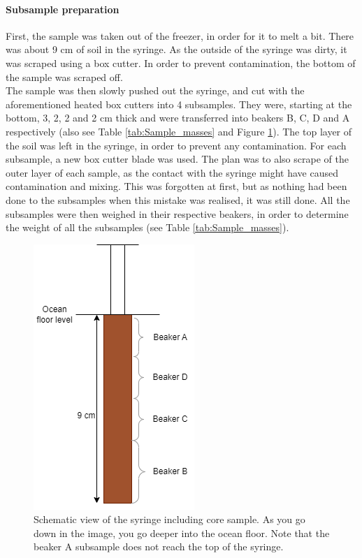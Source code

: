 \documentclass[twocolumn,a4paper,aps,amsmath,amssymb,floatfix,superscriptaddress]{revtex4-2}
\begin{document}
	\paragraph*{Subsample preparation}
	First, the sample was taken out of the freezer, in order for it to melt a bit. There was about 9 cm of soil in the syringe. As the outside of the syringe was dirty, it was scraped using a box cutter. In order to prevent contamination, the bottom of the sample was scraped off. \\
	The sample was then slowly pushed out the syringe, and cut with the aforementioned heated box cutters into 4 subsamples. They were, starting at the bottom, 3, 2, 2 and 2 cm thick and were transferred into beakers B, C, D and A respectively (also see Table \ref{tab:Sample_masses} and Figure \ref{fig:core-schematic}). The top layer of the soil was left in the syringe, in order to prevent any contamination. For each subsample, a new box cutter blade was used. The plan was to also scrape of the outer layer of each sample, as the contact with the syringe might have caused contamination and mixing. This was forgotten at first, but as nothing had been done to the subsamples when this mistake was realised, it was still done. All the subsamples were then weighed in their respective beakers, in order to determine the weight of all the subsamples (see Table \ref{tab:Sample_masses}).\\
	\begin{figure}[t!]
		\centering
		\includegraphics[width=0.7\linewidth]{"Images/Core schematic"}
		\caption{Schematic view of the syringe including core sample. As you go down in the image, you go deeper into the ocean floor. Note that the beaker A subsample does not reach the top of the syringe.}
		\label{fig:core-schematic}
	\end{figure}
	
\end{document}

